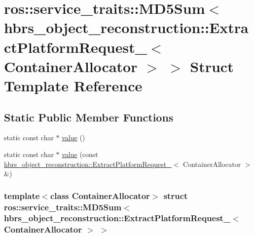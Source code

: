 \hypertarget{structros_1_1service__traits_1_1_m_d5_sum_3_01hbrs__object__reconstruction_1_1_extract_platform_d974a0c713c2fedd447a3b4681f943de}{\section{ros\-:\-:service\-\_\-traits\-:\-:\-M\-D5\-Sum$<$ hbrs\-\_\-object\-\_\-reconstruction\-:\-:\-Extract\-Platform\-Request\-\_\-$<$ \-Container\-Allocator $>$ $>$ \-Struct \-Template \-Reference}
\label{structros_1_1service__traits_1_1_m_d5_sum_3_01hbrs__object__reconstruction_1_1_extract_platform_d974a0c713c2fedd447a3b4681f943de}
}
\subsection*{\-Static \-Public \-Member \-Functions}
\begin{DoxyCompactItemize}
\item 
static const char $\ast$ \hyperlink{structros_1_1service__traits_1_1_m_d5_sum_3_01hbrs__object__reconstruction_1_1_extract_platform_d974a0c713c2fedd447a3b4681f943de_a9e7193a2456d0f3d3a4a5821d45cd884}{value} ()
\item 
static const char $\ast$ \hyperlink{structros_1_1service__traits_1_1_m_d5_sum_3_01hbrs__object__reconstruction_1_1_extract_platform_d974a0c713c2fedd447a3b4681f943de_a743c4099ee8e914a0955316f7d71d8bb}{value} (const \hyperlink{structhbrs__object__reconstruction_1_1_extract_platform_request__}{hbrs\-\_\-object\-\_\-reconstruction\-::\-Extract\-Platform\-Request\-\_\-}$<$ \-Container\-Allocator $>$ \&)
\end{DoxyCompactItemize}
\subsubsection*{template$<$class Container\-Allocator$>$ struct ros\-::service\-\_\-traits\-::\-M\-D5\-Sum$<$ hbrs\-\_\-object\-\_\-reconstruction\-::\-Extract\-Platform\-Request\-\_\-$<$ Container\-Allocator $>$ $>$}



